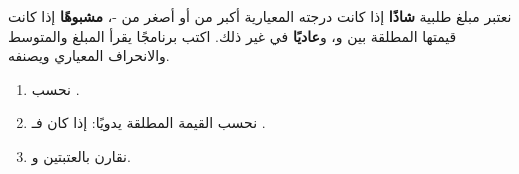 \begin{statement}
نعتبر مبلغ طلبية \textbf{شاذًا} إذا كانت درجته المعيارية أكبر من  أو أصغر من -، \textbf{مشبوهًا} إذا كانت قيمتها المطلقة بين  و، و\textbf{عاديًا} في غير ذلك. اكتب برنامجًا يقرأ المبلغ والمتوسط والانحراف المعياري ويصنفه.
\end{statement}
\begin{stepsbox}\begin{enumerate}
\item نحسب .
\item نحسب القيمة المطلقة يدويًا: إذا كان  فـ .
\item نقارن  بالعتبتين  و.
\end{enumerate}\end{stepsbox}
